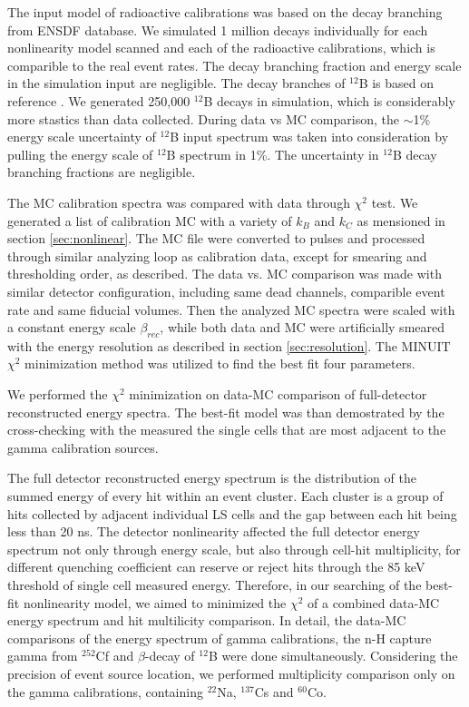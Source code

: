 The input model of radioactive calibrations was based on the decay branching from ENSDF database.
We simulated 1 million decays individually for each nonlinearity model scanned and each of the radioactive calibrations, which is comparible to the real event rates.
The decay branching fraction and energy scale in the simulation input are negligible.
The decay branches of $^{12}$B is based on reference \cite{duke}. 
We generated 250,000 $^{12}$B decays in simulation, which is considerably more stastics than data collected.
During data vs MC comparison, the $\sim$1\% energy scale uncertainty of $^{12}$B input spectrum was taken into consideration by pulling the energy scale of $^{12}$B spectrum in 1\%. 
The uncertainty in $^{12}$B decay branching fractions are negligible.

\label{sec:dataMC}
The MC calibration spectra was compared with data through $\chi^2$ test. 
We generated a list of calibration MC with a variety of $k_B$ and $k_C$ as mensioned in section \ref{sec:nonlinear}. 
The MC file were converted to pulses and processed through similar analyzing loop as calibration data, except for smearing and thresholding order, as described.
The data vs. MC comparison was made with similar detector configuration, including same dead channels, comparible event rate and same fiducial volumes.
Then the analyzed MC spectra were scaled with a constant energy scale $\beta_{rec}$, while both data and MC were artificially smeared with the energy resolution as described in section \ref{sec:resolution}.
The MINUIT $\chi^2$ minimization method was utilized to find the best fit four parameters. 

We performed the $\chi^2$ minimization on data-MC comparison of full-detector reconstructed energy spectra.
The best-fit model was than demostrated by the cross-checking with the measured the single cells that are most adjacent to the gamma calibration sources.

\label{sec:fulldet}
The full detector reconstructed energy spectrum is the distribution of the summed energy of every hit within an event cluster. 
Each cluster is a group of hits collected by adjacent individual LS cells and the gap between each hit being less than 20 ns.
The detector nonlinearity affected the full detector energy spectrum not only through energy scale, but also through cell-hit multiplicity, for different quenching coefficient can reserve or reject hits through the 85 keV threshold of single cell measured energy.
Therefore, in our searching of the best-fit nonlinearity model, we aimed to minimized the $\chi^2$ of a combined data-MC energy spectrum and hit multilicity comparison. 
In detail, the data-MC comparisons of the energy spectrum of gamma calibrations, the n-H capture gamma from $^{252}$Cf and $\beta$-decay of $^{12}$B were done simultaneously.
Considering the precision of event source location, we performed multiplicity comparison only on the gamma calibrations, containing $^{22}$Na, $^{137}$Cs and $^{60}$Co.

